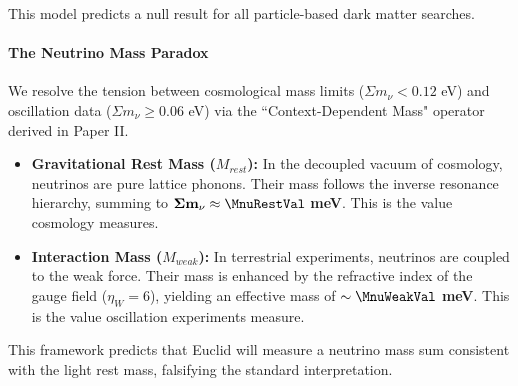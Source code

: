 This model predicts a null result for all particle-based dark matter searches.


\paragraph{The Neutrino Mass Paradox}
We resolve the tension between cosmological mass limits ($\Sigma m_\nu < 0.12$ eV) and oscillation data ($\Sigma m_\nu \ge 0.06$ eV) via the ``Context-Dependent Mass" operator derived in Paper II.
\begin{itemize}
    \item \textbf{Gravitational Rest Mass ($M_{rest}$):} In the decoupled vacuum of cosmology, neutrinos are pure lattice phonons. Their mass follows the inverse resonance hierarchy, summing to $\mathbf{\Sigma m_\nu \approx \MnuRestVal}$ \textbf{meV}. This is the value cosmology measures.
    \item \textbf{Interaction Mass ($M_{weak}$):} In terrestrial experiments, neutrinos are coupled to the weak force. Their mass is enhanced by the refractive index of the gauge field ($\eta_W = 6$), yielding an effective mass of $\mathbf{\sim \MnuWeakVal}$ \textbf{meV}. This is the value oscillation experiments measure.
\end{itemize}
This framework predicts that Euclid will measure a neutrino mass sum consistent with the light rest mass, falsifying the standard interpretation.